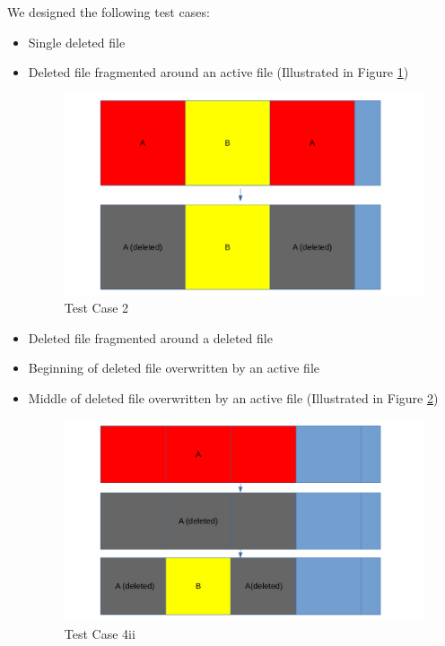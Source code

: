We designed the following test cases:
\begin{itemize}
    \item [1] Single deleted file
    \item [2] Deleted file fragmented around an active file (Illustrated in Figure \ref{fig:case_2})
    \begin{figure}[h]
        \centering
        \includegraphics[width=\linewidth]{fig/case2.png}
        \caption{Test Case 2}
        \label{fig:case_2}
    \end{figure}
    \item [3] Deleted file fragmented around a deleted file
    \item [4i] Beginning of deleted file overwritten by an active file
    \item [4ii] Middle of deleted file overwritten by an active file (Illustrated in Figure \ref{fig:case_4ii})
        \begin{figure}[h]
        \centering
        \includegraphics[width=\linewidth]{fig/case4ii.png}
        \caption{Test Case 4ii}
        \label{fig:case_4ii}
    \end{figure}

\end{itemize}
